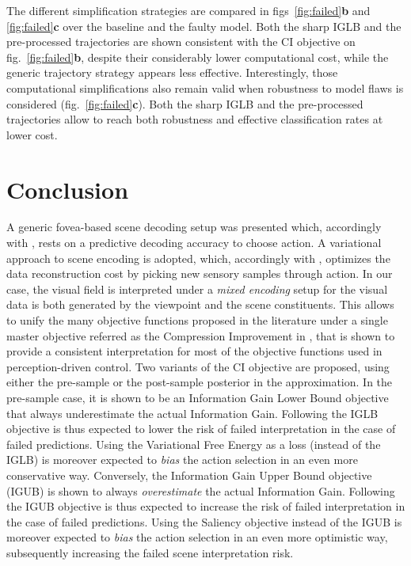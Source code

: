 \documentclass[12pt,twoside,openright]{article}
\begin{document}
The different simplification strategies are compared in figs~\ref{fig:failed}\textbf{b} and \ref{fig:failed}\textbf{c} over the baseline and the faulty model. Both the sharp IGLB and the pre-processed trajectories are shown consistent with the CI objective on fig.~\ref{fig:failed}\textbf{b}, despite their considerably lower computational cost, while the generic trajectory strategy appears less effective. Interestingly, those computational simplifications also remain valid when robustness to model flaws is considered (fig.~\ref{fig:failed}\textbf{c}). 
Both the sharp IGLB and the pre-processed trajectories allow to reach both robustness and effective classification rates at lower cost.


\section{Conclusion}
A generic fovea-based scene decoding setup was presented which, accordingly with \citep{najemnik2005optimal}, rests on a predictive decoding accuracy to choose action. A variational approach to scene encoding is adopted, which, accordingly with \citep{friston2012perceptions}, optimizes the data reconstruction cost by picking new sensory samples through action. In our case, the visual field is interpreted under a \emph{mixed encoding} setup for the visual data is both generated by the viewpoint and the scene constituents. 
This allows to unify the many objective functions proposed in the literature under a single master objective referred as the Compression Improvement in \citep{schmidhuber2007simple}, that is shown to provide a consistent interpretation for most of the objective functions used in perception-driven control. Two variants of the CI objective are proposed, using either the pre-sample or the post-sample posterior in the approximation. In the pre-sample case, it is shown to be an Information Gain Lower Bound objective that always underestimate the actual Information Gain. Following the IGLB objective is thus expected to lower the risk of failed interpretation in the case of failed predictions. Using the Variational Free Energy \citep{friston2015active} as a loss (instead of the IGLB) is moreover expected to \emph{bias} the action selection in an even more conservative way. 
Conversely, the Information Gain Upper Bound objective (IGUB) is shown to always \emph{overestimate} the actual Information Gain. Following the IGUB objective is thus expected to increase the risk of failed interpretation in the case of failed predictions. 
Using the Saliency objective \citep{itti2005bayesian} instead of the IGUB is moreover expected to \emph{bias} the action selection in an even more optimistic way, subsequently increasing the failed scene interpretation risk.
\end{document}
